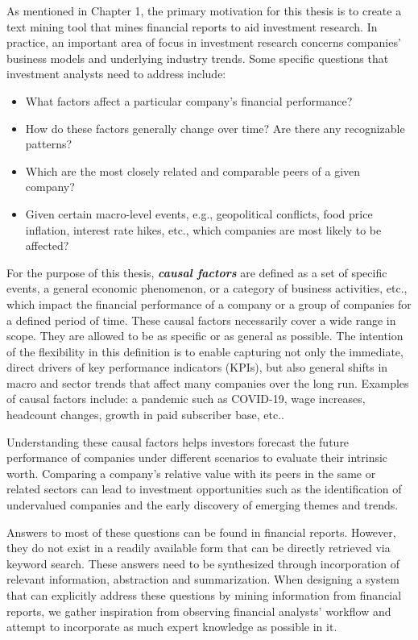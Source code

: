 \documentclass [
     12pt,         %
     a4paper,      %
     BCOR10mm,     %
     DIV14,        %
     liststotoc,   %
     bibtotoc,     %
     idxtotoc,     %
     parskip       %
     ]{scrreprt}
\begin{document}
As mentioned in Chapter 1, the primary motivation for this thesis is to create a text mining tool that mines financial reports to aid investment research. In practice, an important area of focus in investment research concerns companies' business models and underlying industry trends. Some specific questions that investment analysts need to address include:

\begin{itemize}
\item	What factors affect a particular company's financial performance? 
\item	How do these factors generally change over time? Are there any recognizable patterns?
\item  Which are the most closely related and comparable peers of a given company?
\item	Given certain macro-level events, e.g., geopolitical conflicts, food price inflation, interest rate hikes, etc., which companies are most likely to be affected?
\end{itemize}

For the purpose of this thesis, \emph{\textbf{causal factors}} are defined as a set of specific events, a general economic phenomenon, or a category of business activities, etc., which impact the financial performance of a company or a group of companies for a defined period of time. These causal factors necessarily cover a wide range in scope. They are allowed to be as specific or as general as possible. The intention of the flexibility in this definition is to enable capturing not only the immediate, direct drivers of key performance indicators (KPIs), but also general shifts in macro and sector trends that affect many companies over the long run. Examples of causal factors include: a pandemic such as COVID-19, wage increases, headcount changes, growth in paid subscriber base, etc..  

Understanding these causal factors helps investors forecast the future performance of companies under different scenarios to evaluate their intrinsic worth. Comparing a company's relative value with its peers in the same or related sectors can lead to investment opportunities such as the identification of undervalued companies and the early discovery of emerging themes and trends. 

Answers to most of these questions can be found in financial reports. However, they do not exist in a readily available form that can be directly retrieved via keyword search. These answers need to be synthesized through incorporation of relevant information, abstraction and summarization. When designing a system that can explicitly address these questions by mining information from financial reports, we gather inspiration from observing financial analysts' workflow and attempt to incorporate as much expert knowledge as possible in it. 
\end{document}
